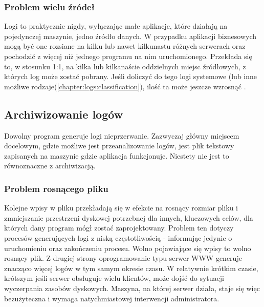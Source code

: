         \subsubsection{Problem wielu źródeł}
        \label{chapter:logs:collecting:multiple_sources}
        Logi to praktycznie nigdy, wyłączając małe aplikacje, które działają na pojedynczej maszynie,
        jedno źródło danych. W przypadku aplikacji biznesowych mogą być one rozsiane na kilku lub nawet
        kilkunastu różnych serwerach oraz pochodzić z więcej niż jednego programu na nim uruchomionego.
        Przekłada się to, w stosunku 1:1, na kilka lub kilkanaście oddzielnych miejsc źródłowych, z których
        log może zostać pobrany. Jeśli doliczyć do tego logi systemowe (lub inne możliwe rodzaje(\ref{chapter:logs:classification}),
        ilość ta może jeszcze wzrosnąć \cite{guide_to_computer_security_log_management}.

    \subsection{Archiwizowanie logów}
    \label{chapter:logs:collecting:archive}
    Dowolny program generuje logi nieprzerwanie. Zazwyczaj główny miejscem docelowym, gdzie możliwe jest
    przeanalizowanie logów, jest plik tekstowy zapisanych na maszynie gdzie aplikacja funkcjonuje.
    Niestety nie jest to równoznaczne z archiwizacją.

        \subsubsection{Problem rosnącego pliku}
        \label{chapter:logs:collecting:archive:larger_and_larger}
        Kolejne wpisy w pliku przekładają się w efekcie na rosnący rozmiar pliku i zmniejszanie przestrzeni dyskowej
        potrzebnej dla innych, kluczowych celów, dla których dany program mógł zostać zaprojektowany.
        Problem ten dotyczy procesów generujących logi z niską częstotliwością - informując jedynie 
        o uruchomieniu oraz zakończeniu procesu. Wolno pojawiające się wpisy to wolno rosnący plik. 
        Z drugiej strony oprogramowanie typu serwer WWW generuje znacząco więcej logów w tym samym okresie czasu.
        W relatywnie krótkim czasie, krótszym jeśli serwer obsługuje wielu klientów, może dojść do sytuacji wyczerpania zasobów
        dyskowych. Maszyna, na której serwer działa, staje się więc bezużyteczna i wymaga natychmiastowej interwencji
        administratora. 
        
